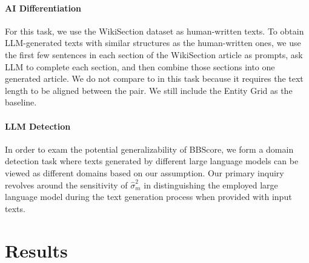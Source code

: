 \documentclass[letterpaper]{article}
\begin{document}
\paragraph{AI Differentiation} For this task, we use the WikiSection dataset as human-written texts. To obtain LLM-generated texts with similar structures as the human-written ones, we use the first few sentences in each section of the WikiSection article as prompts, ask LLM to complete each section, and then combine those sections into one generated article. We do not compare to \citet{moon-etal-2019-unified} in this task because it requires the text length to be aligned between the pair. We still include the Entity Grid as the baseline.

\paragraph{LLM Detection} In order to exam the potential generalizability of BBScore, we form a domain detection task where texts generated by different large language models can be viewed as different domains based on our assumption. Our primary inquiry revolves around the sensitivity of $\hat\sigma^2_m$ in distinguishing the employed large language model during the text generation process when provided with input texts.

\section{Results}
\label{sec:results}

\begin{table}[ht]
\centering
\small
{}
\caption{Global Discrimination Task Results on WikiSection}
\label{wiki-global}
\end{table}
\end{document}
